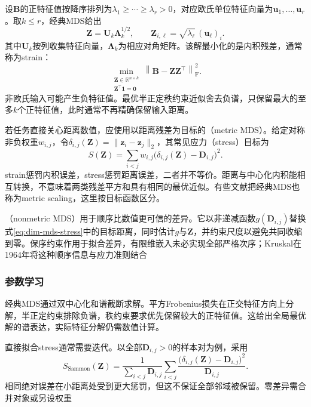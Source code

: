设$\bm{B}$的正特征值按降序排列为$\lambda_1\geq\cdots\geq\lambda_r>0$，对应欧氏单位特征向量为$\bm{u}_1,\ldots,\bm{u}_r$。取$k\leq r$，经典MDS给出
\begin{equation}
  \label{eq:dim-mds-coordinates}
  \bm{Z}=\bm{U}_k\bm{\Lambda}_k^{1/2},
  \qquad
  \bm{Z}_{i,\ell}=\sqrt{\lambda_\ell}\,(\bm{u}_\ell)_i.
\end{equation}
其中$\bm{U}_k$按列收集特征向量，$\bm{\Lambda}_k$为相应对角矩阵。该解最小化的是内积残差，通常称为strain：
\begin{equation}
  \label{eq:dim-mds-strain}
  \min_{\substack{\bm{Z}\in\mathbb{R}^{n\times k}\\
                  \bm{Z}^{\top}\bm{1}=\bm{0}}}
  \left\lVert\bm{B}-\bm{Z}\bm{Z}^{\top}\right\rVert_{\mathrm{F}}^2.
\end{equation}
非欧氏输入可能产生负特征值。最优半正定秩约束近似舍去负谱，只保留最大的至多$k$个正特征值，此时通常不再精确保留输入距离。

若任务直接关心距离数值，应使用以距离残差为目标的（metric MDS）。给定对称非负权重$w_{i,j}$，令$\delta_{i,j}(\bm{Z})=\lVert\bm{z}_i-\bm{z}_j\rVert_2$，其常见应力（stress）目标为
\begin{equation}
  \label{eq:dim-mds-stress}
  S(\bm{Z})
  =\sum_{i<j}w_{i,j}
    \bigl(\delta_{i,j}(\bm{Z})-\bm{D}_{i,j}\bigr)^2.
\end{equation}
strain惩罚内积误差，stress惩罚距离误差，二者并不等价。距离与中心化内积能相互转换，不意味着两类残差平方和具有相同的最优近似。有些文献把经典MDS也称为metric scaling，这里按目标函数区分。

（nonmetric MDS）用于顺序比数值更可信的差异。它以非递减函数$g(\bm{D}_{i,j})$替换式\eqref{eq:dim-mds-stress}中的目标距离，同时估计$g$与$\bm{Z}$，并约束尺度以避免共同收缩到零。保序约束作用于拟合差异，有限维嵌入未必实现全部严格次序；Kruskal在1964年将这种顺序信息与应力准则结合

\subsubsection{参数学习}

经典MDS通过双中心化和谱截断求解。平方Frobenius损失在正交特征方向上分解，半正定约束排除负谱，秩约束要求优先保留较大的正特征值。这给出全局最优解的谱表达，实际特征分解仍需数值计算。

直接拟合stress通常需要迭代。以全部$\bm{D}_{i,j}>0$的样本对为例，采用
\begin{equation}
  \label{eq:dim-sammon}
  S_{\mathrm{Sammon}}(\bm{Z})
  =\frac{1}{\sum_{i<j}\bm{D}_{i,j}}
    \sum_{i<j}
    \frac{\bigl(\delta_{i,j}(\bm{Z})-\bm{D}_{i,j}\bigr)^2}
         {\bm{D}_{i,j}}.
\end{equation}
相同绝对误差在小距离处受到更大惩罚，但这不保证全部邻域被保留。零差异需合并对象或另设权重

